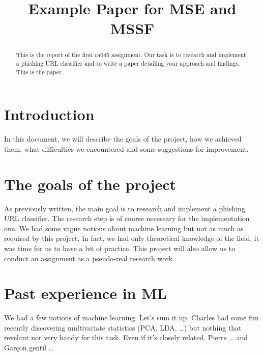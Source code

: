 \documentclass[conference,11pt]{IEEEtran}
\begin{document}
\title{Example Paper for MSE and MSSF}

\author{
\and
{}
\and
{}
}

\maketitle

\begin{abstract}
This is the report of the first ca645 assignment. Our task is to research and
implement a phishing URL classifier and to write a paper detailing your approach
and findings. This is the paper.
\end{abstract}

\section{Introduction}
In this document, we will describe the goals of the project, how we achieved
them, what difficulties we encountered and some suggestions for improvement.

\section{The goals of the project}
As previously written, the main goal is to research and implement a phishing URL
classifier. The research step is of course necessary for the implementation one.
We had some vague notions about machine learning but not as much as required by
this project. In fact, we had only theoretical knowledge of the field, it was
time for us to have a bit of practice. This project will also allow us to
conduct an assignment as a pseudo-real research work.

\section{Past experience in ML}
We had a few notions of machine learning. Let's sum it up. Charles had some fun
recently discovering multivariate statistics (PCA, LDA, \ldots) but nothing that
revelant nor very handy for this task. Even if it's closely related. Pierre \ldots
and Garçon gentil \ldots
\end{document}
